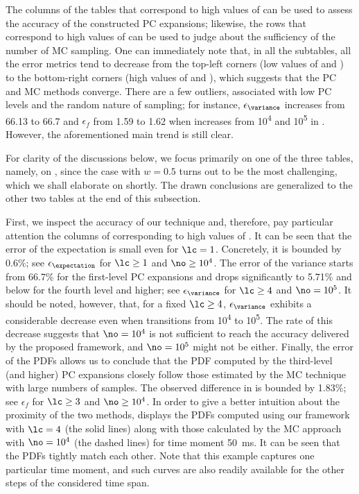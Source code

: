 The columns of the tables that correspond to high values of \no can be used to
assess the accuracy of the constructed \ac{PC} expansions; likewise, the rows
that correspond to high values of \lc can be used to judge about the
sufficiency of the number of \ac{MC} sampling. One can immediately note that,
in all the subtables, all the error metrics tend to decrease from the top-left
corners (low values of \lc and \ns) to the bottom-right corners (high values of
\lc and \ns), which suggests that the \ac{PC} and \ac{MC} methods converge.
There are a few outliers, associated with low \ac{PC} levels and the random
nature of sampling; for instance, $\epsilon_{\variance}$ increases from 66.13 to
66.7 and $\epsilon_f$ from 1.59 to 1.62 when \no increases from
10\textsuperscript{4} and 10\textsuperscript{5} in .
However, the aforementioned main trend is still clear.

For clarity of the discussions below, we focus primarily on one of the three
tables, namely, on , since the case with $w = 0.5$
turns out to be the most challenging, which we shall elaborate on shortly. The
drawn conclusions are generalized to the other two tables at the end of this
subsection.

First, we inspect the accuracy of our technique and, therefore, pay particular
attention the columns of  corresponding to high values
of \no. It can be seen that the error of the expectation is small even for $\lc
= 1$. Concretely, it is bounded by 0.6\%; see $\epsilon_{\expectation}$ for
$\lc \geq 1$ and $\no \geq 10^4$. The error of the variance starts from 66.7\%
for the first-level \ac{PC} expansions and drops significantly to 5.71\% and
below for the fourth level and higher; see $\epsilon_{\variance}$ for $\lc \geq
4$ and $\no = 10^5$. It should be noted, however, that, for a fixed $\lc \geq
4$, $\epsilon_{\variance}$ exhibits a considerable decrease even when \no
transitions from 10\textsuperscript{4} to 10\textsuperscript{5}. The rate of
this decrease suggests that $\no = 10^4$ is not sufficient to reach the accuracy
delivered by the proposed framework, and $\no = 10^5$ might not be either.
Finally, the error of the \acp{PDF} allows us to conclude that the \ac{PDF}
computed by the third-level (and higher) \ac{PC} expansions closely follow those
estimated by the \ac{MC} technique with large numbers of samples. The observed
difference in  is bounded by 1.83\%; see $\epsilon_f$
for $\lc \geq 3$ and $\no \geq 10^4$. In order to give a better intuition about
the proximity of the two methods,  displays the
\acp{PDF} computed using our framework with $\lc = 4$ (the solid lines) along
with those calculated by the \ac{MC} approach with $\no = 10^4$ (the dashed
lines) for time moment 50~ms. It can be seen that the \acp{PDF} tightly match
each other. Note that this example captures one particular time moment, and such
curves are also readily available for the other steps of the considered time
span.

